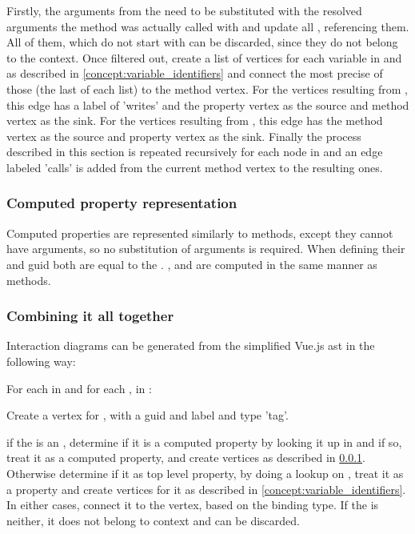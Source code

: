 Firstly, the arguments from the  need to be substituted with the resolved arguments the method was actually called with and update all ,    referencing them. All of them, which do not start with  can be discarded, since they do not belong to the context. Once filtered out, create a list of vertices for each variable in  and  as described in \ref{concept:variable_identifiers} and connect the most precise of those (the last of each list) to the method vertex. For the vertices resulting from , this edge has a label of 'writes' and the property vertex as the source and method vertex as the sink. For the vertices resulting from , this edge has the method vertex as the source and property vertex as the sink. 
Finally the process described in this section is repeated recursively for each  node in  and an edge labeled 'calls' is added from the current method vertex to the resulting ones. 

\subsubsection{Computed property representation}
\label{concept:computed_property}

Computed properties are represented similarly to methods, except they cannot have arguments, so no substitution of arguments is required. When defining their  and \gls{guid} both are equal to the . ,  and  are computed in the same manner as methods. 

\subsubsection{Combining it all together}
\label{concept:algorithm_create_diagrams}

Interaction diagrams can be generated from the simplified Vue.js \gls{ast} in the following way:

For each  in  and for each ,   in :

Create a vertex for , with a \gls{guid}  and label  and type 'tag'.

if the  is an , determine if it is a computed property by looking it up in  and if so, treat it as a computed property, and create vertices as described in \ref{concept:computed_property}. Otherwise determine if it as top level property, by doing a lookup on , treat it as a property and create vertices for it as described in \ref{concept:variable_identifiers}. In either cases, connect it to the  vertex, based on the binding type. If the  is neither, it does not belong to context and can be discarded. %


